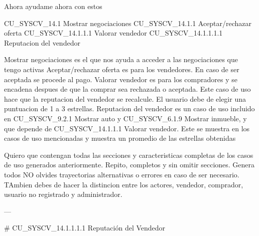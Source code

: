 Ahora ayudame ahora con estos

CU_SYSCV_14.1 Mostrar negociaciones
	CU_SYSCV_14.1.1 Aceptar/rechazar oferta
		CU_SYSCV_14.1.1.1 Valorar vendedor
			CU_SYSCV_14.1.1.1.1 Reputacion del vendedor

Mostrar negociaciones es el que nos ayuda a acceder a las negociaciones que tengo activas
Aceptar/rechazar oferta es para los vendedores. En caso de ser aceptada se procede al pago.
Valorar vendedor es para los compradores y se encadena despues de que la comprar sea rechazada o aceptada. Este caso de uso hace que la reputacion del vendedor se recalcule. El usuario debe de elegir una puntuacion de 1 a 3 estrellas.
Reputacion del vendedor es un caso de uso incluido en CU_SYSCV_9.2.1 Mostrar auto y CU_SYSCV_6.1.9 Mostrar inmueble, y que depende de CU_SYSCV_14.1.1.1 Valorar vendedor. Este se muestra en los casos de uso mencionadas y muestra un promedio de las estrellas obtenidas

Quiero que contengan todas las secciones y caracteristicas completas de los casos de uso generados anteriormente. 
Repito, completos y sin omitir secciones. Genera todos NO olvides trayectorias alternativas o errores en caso de ser necesario. TAmbien debes de hacer la distincion entre los actores, vendedor, comprador, usuario no registrado y administrador.






---

# CU_SYSCV_14.1.1.1.1 Reputación del Vendedor


